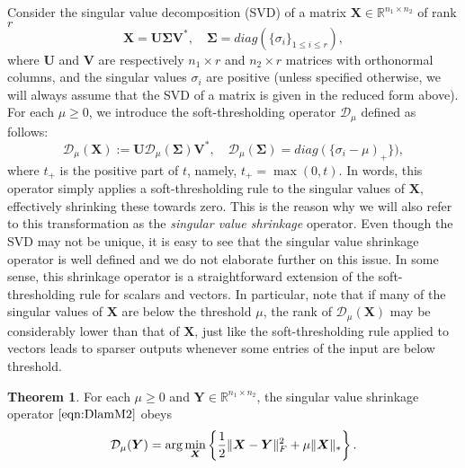\documentclass[conference,onecolumn,12pt]{IEEEtran}
\newcommand{\R}{\mathbb{R}}
\newcommand{\mtx}[1]{\bm{#1}}
\newcommand{\mymathbf}[1]{\mbox{\boldmath$#1$}}
\numberwithin{equation}{section}
\numberwithin{figure}{section}
\numberwithin{table}{section}
\theoremstyle{definition}
\newtheorem{theorem}{Theorem}
\begin{document}
Consider the singular value decomposition (SVD) of a matrix $\mtx{X}
\in \R^{n_1 \times n_2}$ of rank $r$
\begin{equation}
  \label{eq:svd}
  \mtx{X} = \mtx{U}  \mtx{\Sigma}   \mtx{V}^*,
\quad   \mtx{\Sigma}  = diag(\{\sigma_i\}_{1 \le i \le r}),
\end{equation}
where $\mtx{U}$ and $\mtx{V}$ are respectively $n_1 \times r$ and $n_2
\times r$ matrices with orthonormal columns, and the singular values
$\sigma_i$ are positive (unless specified otherwise, we will always
assume that the SVD of a matrix is given in the reduced form
above). For each $\mu \ge 0$, we introduce the soft-thresholding
operator $\mathcal{D}_\mu$ defined as follows:
\begin{equation}
\label{eqn:DlamM2} \mathcal{D}_{\mu}(\mtx{X}):=  \mtx{U}
\mathcal{D}_{\mu}(\mtx{\Sigma}) \mtx{V}^*, \quad
\mathcal{D}_{\mu}(\mtx{\Sigma}) = diag(\{\sigma_i - \mu)_+\}),
\end{equation}
where $t_+$ is the positive part of $t$, namely, $t_+ = \max(0,t)$. In
words, this operator simply applies a soft-thresholding rule to the
singular values of $\mtx{X}$, effectively shrinking these towards
zero. This is the reason why we will also refer to this transformation
as the {\em singular value shrinkage} operator. Even though the SVD
may not be unique, it is easy to see that the singular value shrinkage
operator is well defined and we do not elaborate further on this
issue.  In some sense, this shrinkage operator is a straightforward
extension of the soft-thresholding rule for scalars and vectors. In
particular, note that if many of the singular values of $\mtx{X}$ are
below the threshold $\mu$, the rank of $\mathcal{D}_{\mu}(\mtx{X})$
may be considerably lower than that of $\mtx{X}$, just like the
soft-thresholding rule applied to vectors leads to sparser outputs
whenever some entries of the input are below threshold.
\begin{theorem}\label{thm:prox}
    For each $\mu \ge 0$ and $\mtx{Y} \in \R^{n_1 \times n_2}$, the
    singular value shrinkage operator $\eqref{eqn:DlamM2}$ obeys
  \begin{equation}
  \label{eqn:DlamM}
  \mathcal{D}_{\mu}(\mtx{Y}) = \arg\min_{\mtx{X}} \left\{
  \frac12\|\mtx{X}-\mtx{Y}\|_F^2 + \mu\|\mymathbf{X}\|_{*}
  \right\}.
  \end{equation}
  \end{theorem}
\end{document}
